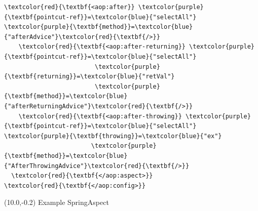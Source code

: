 \documentclass[10pt,xcolor=pdflatex, table]{beamer}
\begin{document}
\begin{frame}[fragile]
\begin{Verbatim}[fontsize=\footnotesize, commandchars=\\\{\}]
    \textcolor{red}{\textbf{<aop:after}} \textcolor{purple}{\textbf{pointcut-ref}}=\textcolor{blue}{"selectAll"} \textcolor{purple}{\textbf{method}}=\textcolor{blue}{"afterAdvice"}\textcolor{red}{\textbf{/>}}
    \textcolor{red}{\textbf{<aop:after-returning}} \textcolor{purple}{\textbf{pointcut-ref}}=\textcolor{blue}{"selectAll"} 
                         \textcolor{purple}{\textbf{returning}}=\textcolor{blue}{"retVal"} 	
                         \textcolor{purple}{\textbf{method}}=\textcolor{blue}{"afterReturningAdvice"}\textcolor{red}{\textbf{/>}}
    \textcolor{red}{\textbf{<aop:after-throwing}} \textcolor{purple}{\textbf{pointcut-ref}}=\textcolor{blue}{"selectAll"} \textcolor{purple}{\textbf{throwing}}=\textcolor{blue}{"ex"} 	
                        \textcolor{purple}{\textbf{method}}=\textcolor{blue}{"AfterThrowingAdvice"}\textcolor{red}{\textbf{/>}}
  \textcolor{red}{\textbf{</aop:aspect>}}
\textcolor{red}{\textbf{</aop:config>}}
	\end{Verbatim}
\begin{textblock}{15}(10.0,-0.2)
    {\footnotesize Example SpringAspect}
\end{textblock}
\end{frame}
\end{document}
